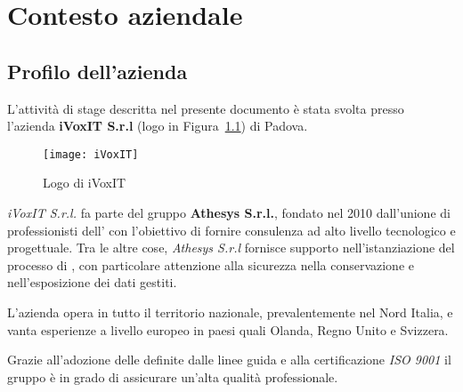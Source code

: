 \chapter{Contesto aziendale} \label{azienda}
\section{Profilo dell'azienda}
L'attività di stage descritta nel presente documento è stata svolta presso l'azienda \textbf{iVoxIT S.r.l} (logo in Figura~\ref{fig:ivoxit}) di Padova. 

\begin{figure}[h]
\begin{center}
\texttt{[image: iVoxIT]}
\caption{Logo di iVoxIT}
\label{fig:ivoxit}
\end{center}
\end{figure}
\textit{iVoxIT S.r.l.} fa parte del gruppo \textbf{Athesys S.r.l.}, fondato nel 2010 dall'unione di professionisti dell' con l'obiettivo di fornire consulenza ad alto livello tecnologico e progettuale. Tra le altre cose, \textit{Athesys S.r.l} fornisce supporto nell'istanziazione del processo di , con particolare attenzione alla sicurezza nella conservazione e nell'esposizione dei dati gestiti.

L'azienda opera in tutto il territorio nazionale, prevalentemente nel Nord Italia, e vanta esperienze a livello europeo in paesi quali Olanda, Regno Unito e Svizzera.

Grazie all'adozione delle  definite dalle linee guida  e alla certificazione \textit{ISO 9001} il gruppo è in grado di assicurare un'alta qualità professionale.

